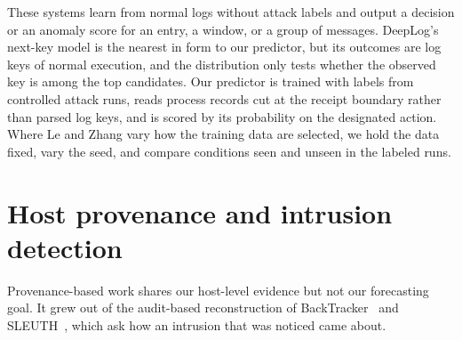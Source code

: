 These systems learn from normal logs without attack labels and output
a decision or an anomaly score for an entry, a window, or a group of
messages. DeepLog's next-key model is the nearest in form to our
predictor, but its outcomes are log keys of normal execution, and the
distribution only tests whether the observed key is among the top
candidates.
Our predictor is trained with labels from controlled attack runs,
reads process records cut at the receipt boundary rather than parsed
log keys, and is scored by its probability on the designated action.
Where Le and Zhang vary how the training data are selected, we hold the
data fixed, vary the seed, and compare conditions seen and unseen in
the labeled runs.

\section{Host provenance and intrusion detection}
\label{sec:related-provenance}

Provenance-based work shares our host-level evidence but not our
forecasting goal. It grew out of the audit-based reconstruction of
BackTracker~\cite{king2003backtracking} and
SLEUTH~\cite{hossain2017sleuth}, which ask how an intrusion that was
noticed came about.

